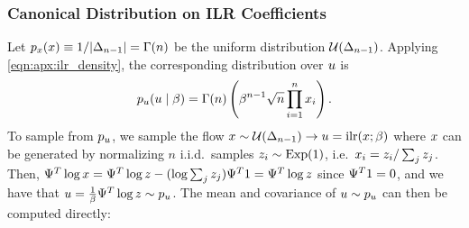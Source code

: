 \subsubsection{Canonical Distribution on \gls*{ILR} Coefficients}\label{sec:apx:ilr_canonical}

Let $p_{x}(x) \equiv 1/|\Delta_{n-1}| = \Gamma(n)$ be the uniform distribution $\mathcal{U}(\Delta_{n-1})$.
Applying \eqref{eqn:apx:ilr_density}, the corresponding distribution over $u$ is
\begin{align}\label{eqn:apx:ilr_uniform_prior}
    p_{u}(u \mid \beta) = \Gamma(n) \left( \beta^{n-1} \sqrt{n} \prod_{i=1}^{n} x_{i} \right).
\end{align}
To sample from $p_{u}$, we sample the flow $\vv{x} \sim \mathcal{U}(\ProbSimplex{n-1}) \rightarrow \vv{u} = \ILR{\vv{x}; \beta}$ where $x$ can be generated by normalizing $n$ i.i.d.\ samples $z_{i} \sim \operatorname{Exp}(1)$, i.e.\ $x_{i} = z_{i} / \sum_{j} z_{j}$.
Then, $\Psi^T \log x = \Psi^T \log z - (\log\sum_{j} z_{j}) \Psi^T \mathrm{1} = \Psi^T \log z$ since $\Psi^T \mathrm{1} = \mathrm{0}$, and we have that $u = \frac{1}{\beta} \Psi^T \log z \sim p_{u}$.
The mean and covariance of $u \sim p_{u}$ can then be computed directly:
